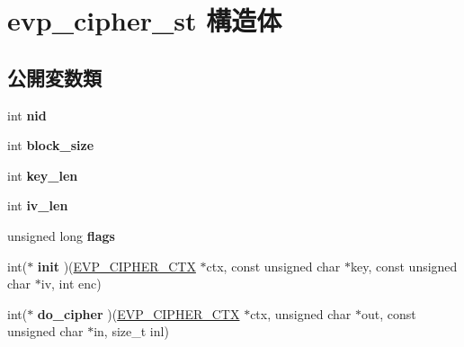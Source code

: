 \hypertarget{structevp__cipher__st}{}\section{evp\+\_\+cipher\+\_\+st 構造体}
\label{structevp__cipher__st}
\subsection*{公開変数類}
\begin{DoxyCompactItemize}
\item 
\hypertarget{structevp__cipher__st_a3e92a36ebcc6d193fa91f0edf7aa5561}{}int {\bfseries nid}\label{structevp__cipher__st_a3e92a36ebcc6d193fa91f0edf7aa5561}

\item 
\hypertarget{structevp__cipher__st_a63036565998126ddd20ba6b1b901df28}{}int {\bfseries block\+\_\+size}\label{structevp__cipher__st_a63036565998126ddd20ba6b1b901df28}

\item 
\hypertarget{structevp__cipher__st_a6f3df99c0808facaf1a5bb730cbd0b22}{}int {\bfseries key\+\_\+len}\label{structevp__cipher__st_a6f3df99c0808facaf1a5bb730cbd0b22}

\item 
\hypertarget{structevp__cipher__st_add3e3ebb7252cd8326a98d309877a134}{}int {\bfseries iv\+\_\+len}\label{structevp__cipher__st_add3e3ebb7252cd8326a98d309877a134}

\item 
\hypertarget{structevp__cipher__st_a84a16719073d93e98517a6b38c47ba3f}{}unsigned long {\bfseries flags}\label{structevp__cipher__st_a84a16719073d93e98517a6b38c47ba3f}

\item 
\hypertarget{structevp__cipher__st_a1459fa00f4ae13d2f6ede957ec33165c}{}int($\ast$ {\bfseries init} )(\hyperlink{structevp__cipher__ctx__st}{E\+V\+P\+\_\+\+C\+I\+P\+H\+E\+R\+\_\+\+C\+T\+X} $\ast$ctx, const unsigned char $\ast$key, const unsigned char $\ast$iv, int enc)\label{structevp__cipher__st_a1459fa00f4ae13d2f6ede957ec33165c}

\item 
\hypertarget{structevp__cipher__st_aa61fb3ac50f7917d1c00475f537d8328}{}int($\ast$ {\bfseries do\+\_\+cipher} )(\hyperlink{structevp__cipher__ctx__st}{E\+V\+P\+\_\+\+C\+I\+P\+H\+E\+R\+\_\+\+C\+T\+X} $\ast$ctx, unsigned char $\ast$out, const unsigned char $\ast$in, size\+\_\+t inl)\label{structevp__cipher__st_aa61fb3ac50f7917d1c00475f537d8328}


\end{DoxyCompactItemize}
